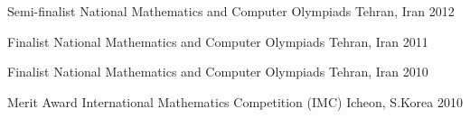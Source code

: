 \begin{cvhonors}

  \cvhonor
    {Semi-finalist} %
    {National Mathematics and Computer Olympiads} %
    {Tehran, Iran} %
    {2012} %

  \cvhonor
    {Finalist} %
    {National Mathematics and Computer Olympiads} %
    {Tehran, Iran} %
    {2011} %

  \cvhonor
    {Finalist} %
    {National Mathematics and Computer Olympiads} %
    {Tehran, Iran} %
    {2010} %

  \cvhonor
    {Merit Award} %
    {International Mathematics Competition (IMC)} %
    {Icheon, S.Korea} %
    {2010} %

\end{cvhonors}
